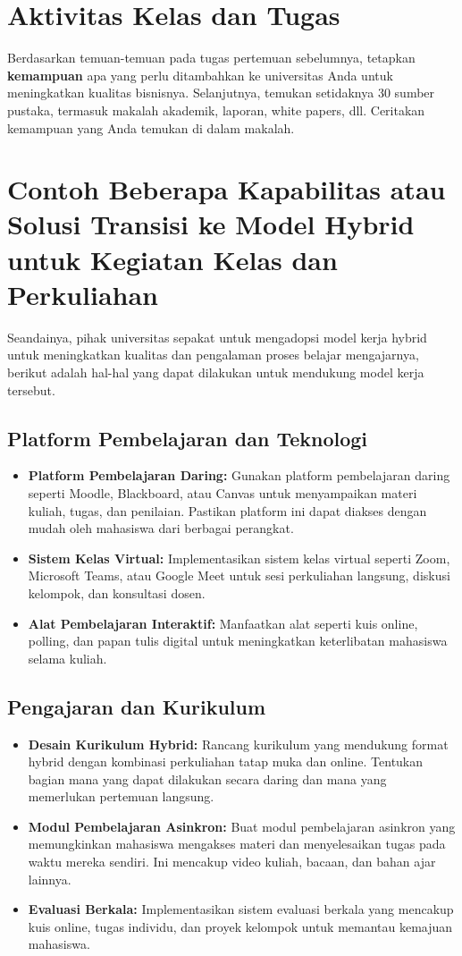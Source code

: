 \section{Aktivitas Kelas dan Tugas}
Berdasarkan temuan-temuan pada tugas pertemuan sebelumnya, tetapkan \textbf{kemampuan} apa yang perlu ditambahkan ke universitas Anda untuk meningkatkan kualitas bisnisnya. Selanjutnya, temukan setidaknya 30 sumber pustaka, termasuk makalah akademik, laporan, white papers, dll. Ceritakan kemampuan yang Anda temukan di dalam makalah.

\section{Contoh Beberapa Kapabilitas atau Solusi Transisi ke Model Hybrid untuk Kegiatan Kelas dan Perkuliahan}

Seandainya, pihak universitas sepakat untuk mengadopsi model kerja hybrid untuk meningkatkan kualitas dan pengalaman proses belajar mengajarnya, berikut adalah hal-hal yang dapat dilakukan untuk mendukung model kerja tersebut.

\subsection{Platform Pembelajaran dan Teknologi}
\begin{itemize}
	\item \textbf{Platform Pembelajaran Daring:} Gunakan platform pembelajaran daring seperti Moodle, Blackboard, atau Canvas untuk menyampaikan materi kuliah, tugas, dan penilaian. Pastikan platform ini dapat diakses dengan mudah oleh mahasiswa dari berbagai perangkat.
	\item \textbf{Sistem Kelas Virtual:} Implementasikan sistem kelas virtual seperti Zoom, Microsoft Teams, atau Google Meet untuk sesi perkuliahan langsung, diskusi kelompok, dan konsultasi dosen.
	\item \textbf{Alat Pembelajaran Interaktif:} Manfaatkan alat seperti kuis online, polling, dan papan tulis digital untuk meningkatkan keterlibatan mahasiswa selama kuliah.
\end{itemize}

\subsection{Pengajaran dan Kurikulum}
\begin{itemize}
	\item \textbf{Desain Kurikulum Hybrid:} Rancang kurikulum yang mendukung format hybrid dengan kombinasi perkuliahan tatap muka dan online. Tentukan bagian mana yang dapat dilakukan secara daring dan mana yang memerlukan pertemuan langsung.
	\item \textbf{Modul Pembelajaran Asinkron:} Buat modul pembelajaran asinkron yang memungkinkan mahasiswa mengakses materi dan menyelesaikan tugas pada waktu mereka sendiri. Ini mencakup video kuliah, bacaan, dan bahan ajar lainnya.
	\item \textbf{Evaluasi Berkala:} Implementasikan sistem evaluasi berkala yang mencakup kuis online, tugas individu, dan proyek kelompok untuk memantau kemajuan mahasiswa.
\end{itemize}


